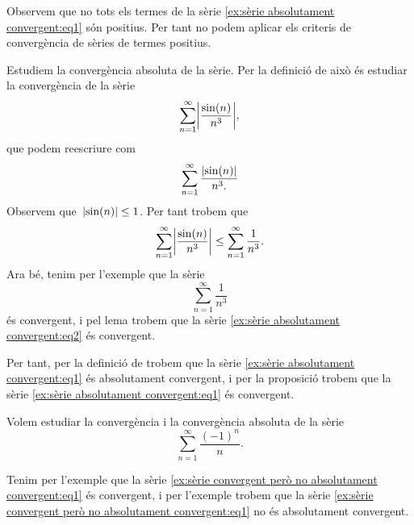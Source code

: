 \documentclass[../../main.tex]{subfiles}
\begin{document}
    \begin{solution}
        Observem que no tots els termes de la sèrie \eqref{ex:sèrie absolutament convergent:eq1} són positius.
        Per tant no podem aplicar els criteris de convergència de sèries de termes positius.

        Estudiem la convergència absoluta de la sèrie.
        Per la definició de  això és estudiar la convergència de la sèrie
        \begin{equation}
            \label{ex:sèrie absolutament convergent:eq2}
            \sum_{n=1}^{\infty}\abs{\frac{\sin(n)}{n^{3}}},
        \end{equation}
        que podem reescriure com
        \[
            \sum_{n=1}^{\infty}\frac{\abs{\sin(n)}}{n^{3}.}
        \]
        Observem que~\(\abs{\sin(n)}\leq1\).
        Per tant trobem que
        \[
            \sum_{n=1}^{\infty}\abs{\frac{\sin(n)}{n^{3}}}\leq\sum_{n=1}^{\infty}\frac{1}{n^{3}}.
        \]
        Ara bé, tenim per l'exemple  que la sèrie
        \[
            \sum_{n=1}^{\infty}\frac{1}{n^{3}}
        \]
        és convergent, i pel lema  trobem que la sèrie \eqref{ex:sèrie absolutament convergent:eq2} és convergent.

        Per tant, per la definició de  trobem que la sèrie \eqref{ex:sèrie absolutament convergent:eq1} és absolutament convergent, i per la proposició  trobem que la sèrie \eqref{ex:sèrie absolutament convergent:eq1} és convergent.
    \end{solution}
    \begin{example} %
        \label{ex:sèrie convergent però no absolutament convergent}
        Volem estudiar la convergència i la convergència absoluta de la sèrie
        \begin{equation}
            \label{ex:sèrie convergent però no absolutament convergent:eq1}
            \sum_{n=1}^{\infty}\frac{(-1)^{n}}{n}.
        \end{equation}
    \end{example}
    \begin{solution}
        Tenim per l'exemple  que la sèrie \eqref{ex:sèrie convergent però no absolutament convergent:eq1} és convergent, i per l'exemple  trobem que la sèrie \eqref{ex:sèrie convergent però no absolutament convergent:eq1} no és absolutament convergent.
    \end{solution}
\end{document}
